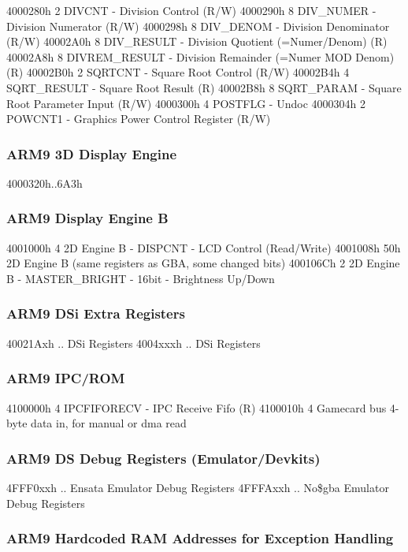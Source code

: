 \documentclass[11pt,a4paper]{proc}
\begin{document}
\begin{flushleft}
  4000280h  2  DIVCNT - Division Control (R/W)
  4000290h  8  DIV\_NUMER - Division Numerator (R/W)
  4000298h  8  DIV\_DENOM - Division Denominator (R/W)
  40002A0h  8  DIV\_RESULT - Division Quotient (=Numer/Denom) (R)
  40002A8h  8  DIVREM\_RESULT - Division Remainder (=Numer MOD Denom) (R)
  40002B0h  2  SQRTCNT - Square Root Control (R/W)
  40002B4h  4  SQRT\_RESULT - Square Root Result (R)
  40002B8h  8  SQRT\_PARAM - Square Root Parameter Input (R/W)
  4000300h  4  POSTFLG - Undoc
  4000304h  2  POWCNT1 - Graphics Power Control Register (R/W)

\subsubsection{ARM9 3D Display Engine}

  4000320h..6A3h

\subsubsection{ARM9 Display Engine B}

  4001000h  4    2D Engine B - DISPCNT - LCD Control (Read/Write)
  4001008h  50h  2D Engine B (same registers as GBA, some changed bits)
  400106Ch  2    2D Engine B - MASTER\_BRIGHT - 16bit - Brightness Up/Down

\subsubsection{ARM9 DSi Extra Registers}

  40021Axh  ..  DSi Registers
  4004xxxh  ..  DSi Registers

\subsubsection{ARM9 IPC/ROM}

  4100000h  4    IPCFIFORECV - IPC Receive Fifo (R)
  4100010h  4    Gamecard bus 4-byte data in, for manual or dma read

\subsubsection{ARM9 DS Debug Registers (Emulator/Devkits)}

  4FFF0xxh  ..   Ensata Emulator Debug Registers
  4FFFAxxh  ..   No\$gba Emulator Debug Registers

\subsubsection{ARM9 Hardcoded RAM Addresses for Exception Handling}


\end{flushleft}
\end{document}
